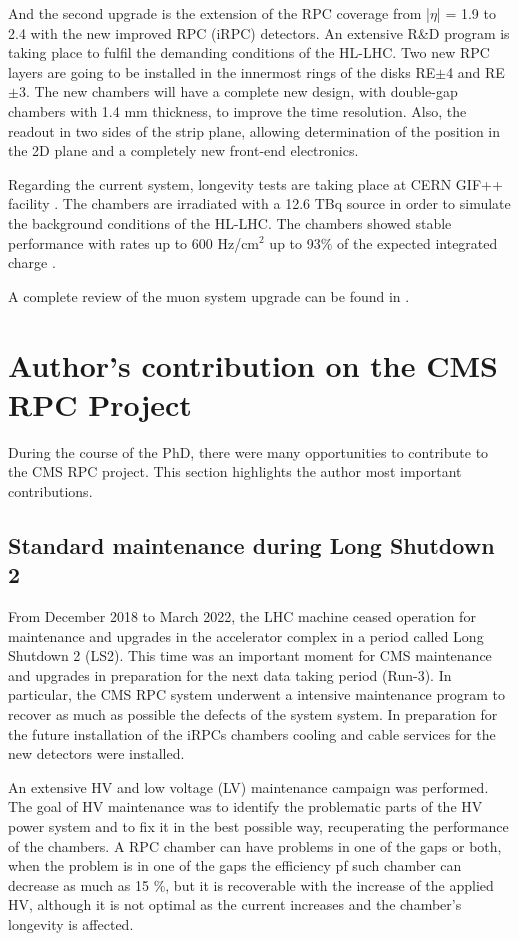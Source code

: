 And the second upgrade is the extension of the RPC coverage from |$\eta$| = 1.9 to 2.4 with the new improved RPC (iRPC) detectors. An extensive R\&D program is taking place to fulfil the demanding conditions of the HL-LHC. Two new RPC layers are going to be installed in the innermost rings of the disks RE$\pm$4 and RE$\pm$3. The new chambers will have a complete new design, with double-gap chambers with 1.4 mm thickness, to improve the time resolution. Also, the readout in two sides of the strip plane, allowing determination of the position in the 2D plane and a completely new front-end electronics. 

Regarding the current system, longevity tests are taking place at CERN GIF++ facility \cite{guida2015gif++}. The chambers are irradiated with a 12.6 TBq source in order to simulate the background conditions of the HL-LHC. The chambers showed stable performance with rates up to 600 Hz/cm$^2$ up to 93\% of the expected integrated charge \cite{Aly_2022}.

A complete review of the muon system upgrade can be found in \cite{CERN-LHCC-2017-012}.

\section{Author's contribution on the CMS RPC Project}

During the course of the PhD, there were many opportunities to contribute to the CMS RPC project. This section highlights the author most important contributions.

\subsection{Standard maintenance during Long Shutdown 2}

From December 2018 to March 2022, the LHC machine ceased operation for maintenance and upgrades in the accelerator complex in a period called Long Shutdown 2 (LS2). This time was an important moment for CMS maintenance and upgrades in preparation for the next data taking period (Run-3). In particular, the CMS RPC system underwent a intensive maintenance program to recover as much as possible the defects of the system system. In preparation for the future installation of the iRPCs chambers cooling and cable services for the new detectors were installed.

An extensive HV and low voltage (LV) maintenance campaign was performed. The goal of HV maintenance was to identify the problematic parts of the HV power system and to fix it in the best possible way, recuperating the performance of the chambers. A RPC chamber can have problems in one of the gaps or both, when the problem is in one of the gaps the efficiency pf such chamber can decrease as much as 15 \%, but it is recoverable with the increase of the applied HV, although it is not optimal as the current increases and the chamber's longevity is affected. 

